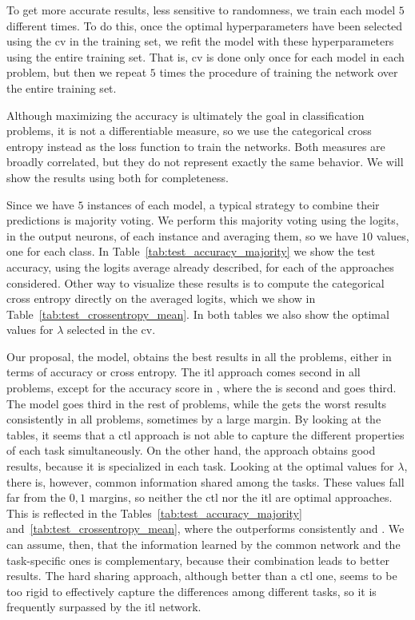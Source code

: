 To get more accurate results, less sensitive to randomness, we train each model $5$ different times. To do this, once the optimal hyperparameters have been selected using the \acrshort{cv} in the training set, we refit the model with these hyperparameters using the entire training set. That is, \acrshort{cv} is done only once for each model in each problem, but then we repeat $5$ times the procedure of training the network over the entire training set.

Although maximizing the accuracy is ultimately the goal in classification problems, it is not a differentiable measure, so we use the categorical cross entropy instead as the loss function to train the networks. Both measures are broadly correlated, but they do not represent exactly the same behavior. We will show the results using both for completeness.

Since we have $5$ instances of each model, a typical strategy to combine their predictions is majority voting. We perform this majority voting using the logits, in the output neurons, of each instance and averaging them, so we have $10$ values, one for each class.
In Table~\ref{tab:test_accuracy_majority} we show the test accuracy, using the logits average already described, for each of the approaches considered.
%
Other way to visualize these results is to compute the categorical cross entropy directly on the averaged logits, which we show in Table~\ref{tab:test_crossentropy_mean}.
%
In both tables we also show the optimal values for $\lambda$ selected in the \acrshort{cv}.

Our proposal, the  model, obtains the best results in all the problems, either in terms of accuracy or cross entropy.
The \acrshort{itl} approach comes second in all problems, except for the accuracy score in , where the  is second and  goes third.
The  model goes third in the rest of problems, while the  gets the worst results consistently in all problems, sometimes by a large margin.
%
By looking at the tables, it seems that a \acrshort{ctl} approach is not able to capture the different properties of each task simultaneously. On the other hand, the  approach obtains good results, because it is specialized in each task.
Looking at the optimal values for $\lambda$, there is, however, common information shared among the tasks. These values fall far from the $0, 1$ margins, so neither the \acrshort{ctl} nor the \acrshort{itl} are optimal approaches. This is reflected in the Tables~\ref{tab:test_accuracy_majority} and~\ref{tab:test_crossentropy_mean}, where the  outperforms consistently  and . We can assume, then, that the information learned by the common network and the task-specific ones is complementary, because their combination leads to better results.
%
The hard sharing approach, although better than a \acrshort{ctl} one, seems to be too rigid to effectively capture the differences among different tasks, so it is frequently surpassed by the \acrshort{itl} network.





